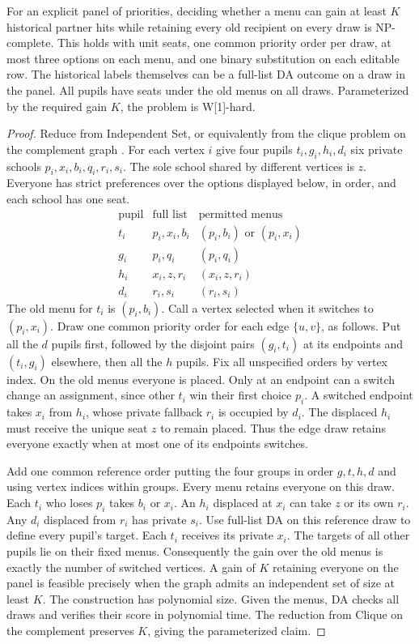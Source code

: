 \begin{theorem}\label{thm:seat-retain}
For an explicit panel of priorities, deciding whether a menu can gain at
least $K$ historical partner hits while retaining every old recipient on every
draw is NP-complete. This holds with unit seats, one common priority order per
draw, at most three options on each menu, and one binary substitution on each
editable row. The historical labels themselves can be a full-list DA outcome
on a draw in the panel. All pupils have seats under the old menus on all draws. Parameterized by the required gain $K$, the problem is W[1]-hard.
\end{theorem}
\begin{proof}
Reduce from Independent Set, or equivalently from the clique problem on the
complement graph \citep{downeyClique}. For each vertex $i$ give four pupils
$t_i,g_i,h_i,d_i$ six private schools $p_i,x_i,b_i,q_i,r_i,s_i$.
The sole school shared by different vertices is $z$. Everyone has strict
preferences over the options displayed below, in order, and each school has
one seat.
\[
\begin{array}{c|c|c}
\text{pupil}&\text{full list}&\text{permitted menus}\\\hline
 t_i&p_i,x_i,b_i&(p_i,b_i)\text{ or }(p_i,x_i)\\
 g_i&p_i,q_i&(p_i,q_i)\\
 h_i&x_i,z,r_i&(x_i,z,r_i)\\
 d_i&r_i,s_i&(r_i,s_i)
\end{array}
\]
The old menu for $t_i$ is $(p_i,b_i)$. Call a vertex selected when it switches
to $(p_i,x_i)$. Draw one common priority order for each edge $\{u,v\}$, as
follows. Put all the $d$ pupils first, followed by the disjoint pairs
$(g_i,t_i)$ at its endpoints and $(t_i,g_i)$ elsewhere, then all the $h$
pupils. Fix all unspecified orders by vertex index.
On the old menus everyone is placed. Only at an endpoint can a switch change
an assignment, since other $t_i$ win their first choice $p_i$. A switched
endpoint takes $x_i$ from $h_i$, whose private fallback $r_i$ is occupied by
$d_i$. The displaced $h_i$ must receive the unique seat $z$ to remain placed.
Thus the edge draw retains everyone exactly when at most one of its endpoints
switches.

Add one common reference order putting the four groups in order $g,t,h,d$ and using vertex indices within groups.
Every menu retains everyone on this draw. Each $t_i$ who loses $p_i$ takes
$b_i$ or $x_i$. An $h_i$ displaced at $x_i$ can take $z$ or its own $r_i$.
Any $d_i$ displaced from $r_i$ has private $s_i$. Use full-list DA on this
reference draw to define every pupil's target. Each $t_i$ receives its private
$x_i$. The targets of all other pupils lie on their fixed menus. Consequently
the gain over the old menus is exactly the number of switched vertices.
A gain of $K$ retaining everyone on the panel is feasible precisely when the
graph admits an independent set of size at least $K$. The construction has
polynomial size. Given the menus, DA checks all draws and verifies their
score in polynomial time. The reduction from Clique on the complement preserves $K$, giving the parameterized claim.
\end{proof}
